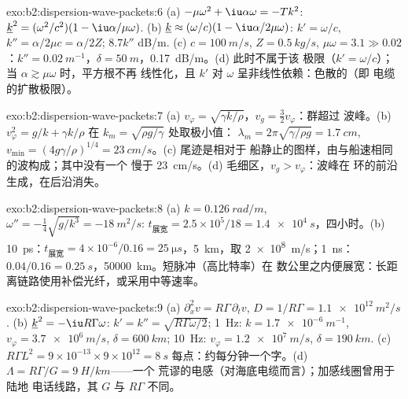 \begin{solution}{exo:b2:dispersion-wave-packets:6}
(a) $-\mu\omega^2 + \iu\alpha\omega = -Tk^2$: $\underline k^2 = (\omega^2/c^2)(1 - \iu\alpha/\mu\omega)$.
(b) $\underline k \approx (\omega/c)(1 - \iu\alpha/2\mu\omega)$: $k' = \omega/c$, $k'' = \alpha/2\mu c =
\alpha/2Z$; $8.7k''$ dB/m. (c) $c = \qty{100}{m/s}$, $Z = \qty{0.5}{kg/s}$, $\mu\omega = 3.1 \gg
0.02$：$k'' = \qty{0.02}{m^{-1}}$，$\delta = \qty{50}{m}$，\qty{0.17}{dB/m}。(d) 此时不属于该
极限（$k' = \omega/c$）；当 $\alpha \gtrsim \mu\omega$ 时，平方根不再
线性化，且 $k'$ 对 $\omega$ 呈非线性依赖：色散的（即
电缆的扩散极限）。
\end{solution}

\begin{solution}{exo:b2:dispersion-wave-packets:7}
(a) $v_\varphi = \sqrt{\gamma k/\rho}$，$v_g = \tfrac32v_\varphi$：群超过
波峰。(b) $v_\varphi^2 = g/k + \gamma k/\rho$ 在 $k_m = \sqrt{\rho g/\gamma}$ 处取极小值：
$\lambda_m = 2\pi\sqrt{\gamma/\rho g} = \qty{1.7}{cm}$, $v_{\min} = (4g\gamma/\rho)^{1/4} =
\qty{23}{cm/s}$。(c) 尾迹是相对于
船静止的图样，由与船速相同的波构成；其中没有一个
慢于 \qty{23}{cm/s}。(d) 毛细区，$v_g > v_\varphi$：波峰在
环的前沿生成，在后沿消失。
\end{solution}

\begin{solution}{exo:b2:dispersion-wave-packets:8}
(a) $k = \qty{0.126}{rad/m}$, $\omega'' = -\tfrac14\sqrt{g/k^3} = \qty{-18}{m^2/s}$: $t_{\text{展宽}}
= 2.5 \times 10^5/18 = \qty{1.4e4}{s}$，四小时。(b) \qty{10}{ps}：$t_{\text{展宽}} =
4 \times 10^{-6}/0.16 = \qty{25}{\micro s}$，\qty{5}{km}，取 \qty{2e8}{m/s}；\qty{1}{ns}：$0.04/0.16 =
\qty{0.25}{s}$，\qty{50000}{km}。短脉冲（高比特率）在
数公里之内便展宽：长距离链路使用补偿光纤，或采用中等速率。
\end{solution}

\begin{solution}{exo:b2:dispersion-wave-packets:9}
(a) $\partial_x^2v = R\Gamma\,\partial_tv$, $D = 1/R\Gamma = \qty{1.1e12}{m^2/s}$. (b) $\underline k^2
= -\iu R\Gamma\omega$: $k' = k'' = \sqrt{R\Gamma\omega/2}$; \qty{1}{Hz}: $k = \qty{1.7e-6}{m^{-1}}$,
$v_\varphi = \qty{3.7e6}{m/s}$, $\delta = \qty{600}{km}$; \qty{10}{Hz}: $v_\varphi = \qty{1.2e7}{m/s}$,
$\delta = \qty{190}{km}$. (c) $R\Gamma L^2 = 9 \times 10^{-13} \times 9 \times 10^{12} = \qty{8}{s}$
每点：约每分钟一个字。(d) $\Lambda = R\Gamma/G = \qty{9}{H/km}$——一个
荒谬的电感（对海底电缆而言）；加感线圈曾用于陆地
电话线路，其 $G$ 与 $R\Gamma$ 不同。
\end{solution}

